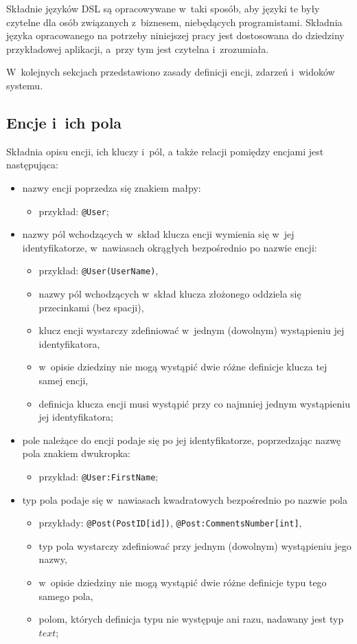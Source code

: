 Składnie języków DSL są opracowywane w~taki sposób, aby języki te były czytelne dla osób związanych z~biznesem, niebędących programistami.
Składnia języka opracowanego na potrzeby niniejszej pracy jest dostosowana do dziedziny przykładowej aplikacji, a~przy tym jest czytelna i~zrozumiała.

W~kolejnych sekcjach przedstawiono zasady definicji encji, zdarzeń i~widoków systemu.


\subsection{Encje i~ich pola}

Składnia opisu encji, ich kluczy i~pól, a także relacji pomiędzy encjami jest następująca:

\begin{itemize}
 \item nazwy encji poprzedza się znakiem małpy:
  \begin{itemize}
   \item przykład: \verb|@User|;
  \end{itemize}
  
 \item nazwy pól wchodzących w~skład klucza encji wymienia się w~jej identyfikatorze, w~nawiasach okrągłych bezpośrednio po nazwie encji:
  \begin{itemize}
   \item przykład: \verb|@User(UserName)|,
   \item nazwy pól wchodzących w~skład klucza złożonego oddziela się przecinkami (bez spacji),
   \item klucz encji wystarczy zdefiniować w~jednym (dowolnym) wystąpieniu jej identyfikatora,
   \item w~opisie dziedziny nie mogą wystąpić dwie różne definicje klucza tej samej encji,
   \item definicja klucza encji musi wystąpić przy co najmniej jednym wystąpieniu jej identyfikatora;
  \end{itemize}
 
 \item pole należące do encji podaje się po jej identyfikatorze, poprzedzając nazwę pola znakiem dwukropka:
  \begin{itemize}
   \item przykład: \verb|@User:FirstName|;
  \end{itemize}
  
 \item typ pola podaje się w~nawiasach kwadratowych bezpośrednio po nazwie pola
  \begin{itemize}
   \item przykłady: \verb|@Post(PostID[id])|, \verb|@Post:CommentsNumber[int]|,
   \item typ pola wystarczy zdefiniować przy jednym (dowolnym) wystąpieniu jego nazwy,
   \item w~opisie dziedziny nie mogą wystąpić dwie różne definicje typu tego samego pola,
   \item polom, których definicja typu nie występuje ani razu, nadawany jest typ $text$;
  \end{itemize}
 

\end{itemize}
